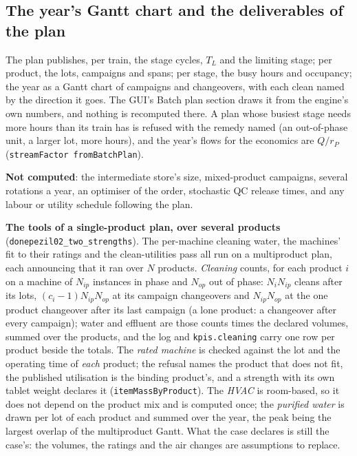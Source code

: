 \documentclass[11pt,a4paper]{article}
\begin{document}
\subsection{The year's Gantt chart and the deliverables of the
plan}\label{mp-gantt}

The plan publishes, per train, the stage cycles, $T_L$ and the limiting
stage; per product, the lots, campaigns and spans; per stage, the busy
hours and occupancy; the year as a Gantt chart of campaigns and
changeovers, with each clean named by the direction it goes. The GUI's
Batch plan section draws it from the engine's own numbers, and nothing
is recomputed there. A plan whose busiest stage needs more hours than its
train has is refused with the remedy named (an out-of-phase unit, a
larger lot, more hours), and the year's flows for the economics are
$Q/r_P$ (\texttt{streamFactor fromBatchPlan}).

\textbf{Not computed}: the intermediate store's size, mixed-product
campaigns, several rotations a year, an optimiser of the order,
stochastic QC release times, and any labour or utility schedule following
the plan.

\textbf{The tools of a single-product plan, over several products}
(\texttt{donepezil02\_two\_strengths}). The per-machine cleaning water,
the machines' fit to their ratings and the clean-utilities pass all run
on a multiproduct plan, each announcing that it ran over $N$ products.
\emph{Cleaning} counts, for each product $i$ on a machine of $N_{ip}$
instances in phase and $N_{op}$ out of phase: $N_i N_{ip}$ cleans after
its lots, $(c_i-1)N_{ip}N_{op}$ at its campaign changeovers and
$N_{ip}N_{op}$ at the one product changeover after its last campaign
(a lone product: a changeover after every campaign); water and effluent
are those counts times the declared volumes, summed over the products,
and the log and \texttt{kpis.cleaning} carry one row per product beside
the totals. The \emph{rated machine} is checked against the lot and the
operating time of \emph{each} product; the refusal names the product
that does not fit, the published utilisation is the binding product's,
and a strength with its own tablet weight declares it
(\texttt{itemMassByProduct}). The \emph{HVAC} is room-based, so it does
not depend on the product mix and is computed once; the \emph{purified
water} is drawn per lot of each product and summed over the year, the
peak being the largest overlap of the multiproduct Gantt. What the case
declares is still the case's: the volumes, the ratings and the air
changes are assumptions to replace.
\end{document}
